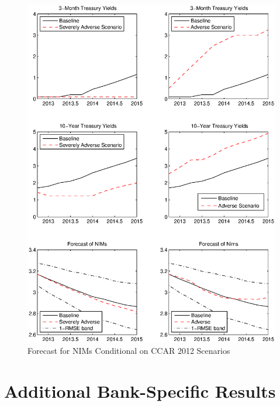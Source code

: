 \documentclass[11pt]{article}
\begin{document}
\clearpage
\begin{figure}
\center
\caption{Forecast for NIMs Conditional on CCAR 2012 Scenarios} \label{figure_scenario}

 \includegraphics[scale=0.8]{figure_scenario.ps}
\end{figure}

\clearpage
\appendix

\section{Additional Bank-Specific Results}
\end{document}
